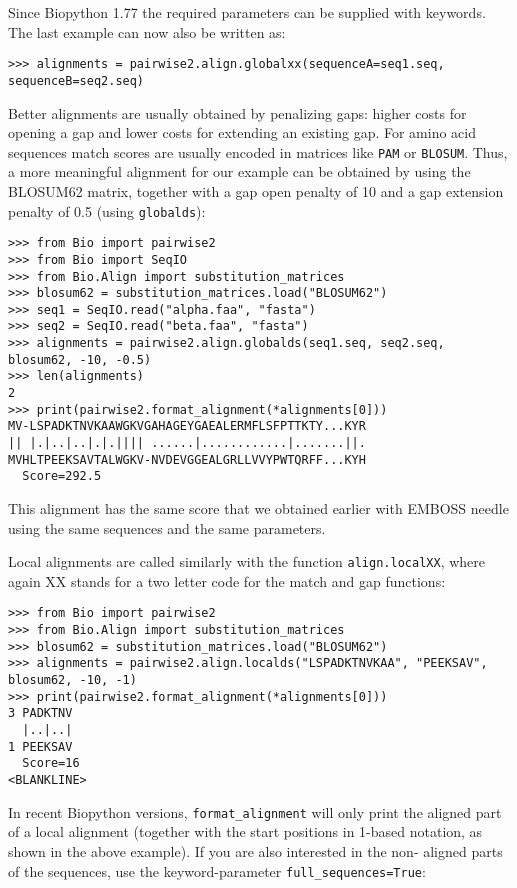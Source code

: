Since Biopython 1.77 the required parameters can be supplied with keywords. The
last example can now also be written as:

\begin{verbatim}
>>> alignments = pairwise2.align.globalxx(sequenceA=seq1.seq, sequenceB=seq2.seq)
\end{verbatim}

Better alignments are usually obtained by penalizing gaps: higher costs
for opening a gap and lower costs for extending an existing gap. For amino
acid sequences match scores are usually encoded in matrices like \texttt{PAM}
or \texttt{BLOSUM}. Thus, a more meaningful alignment for our example can be
obtained by using the BLOSUM62 matrix, together with a gap open penalty of 10
and a gap extension penalty of 0.5 (using \verb|globalds|):

\begin{verbatim}
>>> from Bio import pairwise2
>>> from Bio import SeqIO
>>> from Bio.Align import substitution_matrices
>>> blosum62 = substitution_matrices.load("BLOSUM62")
>>> seq1 = SeqIO.read("alpha.faa", "fasta")
>>> seq2 = SeqIO.read("beta.faa", "fasta")
>>> alignments = pairwise2.align.globalds(seq1.seq, seq2.seq, blosum62, -10, -0.5)
>>> len(alignments)
2
>>> print(pairwise2.format_alignment(*alignments[0]))
MV-LSPADKTNVKAAWGKVGAHAGEYGAEALERMFLSFPTTKTY...KYR
|| |.|..|..|.|.|||| ......|............|.......||.
MVHLTPEEKSAVTALWGKV-NVDEVGGEALGRLLVVYPWTQRFF...KYH
  Score=292.5

\end{verbatim}

This alignment has the same score that we obtained earlier with EMBOSS needle
using the same sequences and the same parameters.

Local alignments are called similarly with the function \verb|align.localXX|,
where again XX stands for a two letter code for the match and gap functions:

\begin{verbatim}
>>> from Bio import pairwise2
>>> from Bio.Align import substitution_matrices
>>> blosum62 = substitution_matrices.load("BLOSUM62")
>>> alignments = pairwise2.align.localds("LSPADKTNVKAA", "PEEKSAV", blosum62, -10, -1)
>>> print(pairwise2.format_alignment(*alignments[0]))
3 PADKTNV
  |..|..|
1 PEEKSAV
  Score=16
<BLANKLINE>
\end{verbatim}

In recent Biopython versions, \verb|format_alignment| will only print the
aligned part of a local alignment (together with the start positions in 1-based
notation, as shown in the above example). If you are also interested in the non-
aligned parts of the sequences, use the keyword-parameter \verb|full_sequences=True|:

